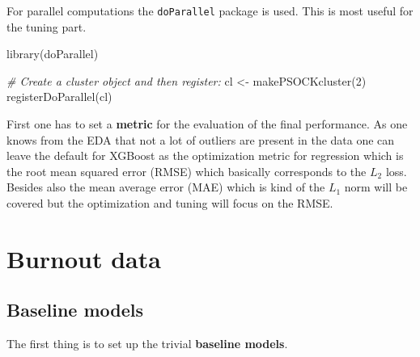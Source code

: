 \documentclass[
]{book}
\newenvironment{Shaded}{\begin{snugshade}}{\end{snugshade}}
\newcommand{\CommentTok}[1]{\textcolor[rgb]{0.56,0.35,0.01}{\textit{#1}}}
\newcommand{\ControlFlowTok}[1]{\textcolor[rgb]{0.13,0.29,0.53}{\textbf{#1}}}
\newcommand{\DecValTok}[1]{\textcolor[rgb]{0.00,0.00,0.81}{#1}}
\newcommand{\FloatTok}[1]{\textcolor[rgb]{0.00,0.00,0.81}{#1}}
\newcommand{\FunctionTok}[1]{\textcolor[rgb]{0.00,0.00,0.00}{#1}}
\newcommand{\NormalTok}[1]{#1}
\newcommand{\OtherTok}[1]{\textcolor[rgb]{0.56,0.35,0.01}{#1}}
\newcommand{\SpecialCharTok}[1]{\textcolor[rgb]{0.00,0.00,0.00}{#1}}
\newcommand{\StringTok}[1]{\textcolor[rgb]{0.31,0.60,0.02}{#1}}
\begin{document}
For parallel computations the \texttt{doParallel} package is used.\citep{doParallel_package}
This is most useful for the tuning part.

\begin{Shaded}
\begin{Highlighting}[]
\FunctionTok{library}\NormalTok{(doParallel)}

\CommentTok{\# Create a cluster object and then register: }
\NormalTok{cl }\OtherTok{\textless{}{-}} \FunctionTok{makePSOCKcluster}\NormalTok{(}\DecValTok{2}\NormalTok{)}
\FunctionTok{registerDoParallel}\NormalTok{(cl)}
\end{Highlighting}
\end{Shaded}

First one has to set a \textbf{metric} for the evaluation of the final performance. As one knows from the EDA that not a lot of outliers are present in the data one can leave the default for XGBoost as the optimization metric for regression which is the root mean squared error (RMSE) which basically corresponds to the \(L_2\) loss. Besides also the mean average error (MAE) which is kind of the \(L_1\) norm will be covered but the optimization and tuning will focus on the RMSE.

\hypertarget{burnout-data-1}{%
\section{Burnout data}\label{burnout-data-1}}

\hypertarget{baseline-models}{%
\subsection{Baseline models}\label{baseline-models}}

The first thing is to set up the trivial \textbf{baseline models}.

\begin{Shaded}
\end{Shaded}
\end{document}
